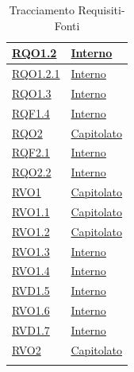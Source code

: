 \begin{longtable}{|>{\centering}m{5cm}|m{5cm}<{\centering}|}
\hyperlink{RQO1.2}{RQO1.2} & \hyperlink{Interno}{Interno}\\ \hline

\hyperlink{RQO1.2.1}{RQO1.2.1} & \hyperlink{Interno}{Interno}\\ \hline

\hyperlink{RQO1.3}{RQO1.3} & \hyperlink{Interno}{Interno}\\ \hline

\hyperlink{RQF1.4}{RQF1.4} & \hyperlink{Interno}{Interno}\\ \hline

\hyperlink{RQO2}{RQO2} & \hyperlink{Capitolato}{Capitolato}\\ \hline

\hyperlink{RQF2.1}{RQF2.1} & \hyperlink{Interno}{Interno}\\ \hline

\hyperlink{RQO2.2}{RQO2.2} & \hyperlink{Interno}{Interno}\\ \hline

\hyperlink{RVO1}{RVO1} & \hyperlink{Capitolato}{Capitolato}\\ \hline

\hyperlink{RVO1.1}{RVO1.1} & \hyperlink{Capitolato}{Capitolato}\\ \hline

\hyperlink{RVO1.2}{RVO1.2} & \hyperlink{Capitolato}{Capitolato}\\ \hline

\hyperlink{RVO1.3}{RVO1.3} & \hyperlink{Interno}{Interno}\\ \hline

\hyperlink{RVO1.4}{RVO1.4} & \hyperlink{Interno}{Interno}\\ \hline

\hyperlink{RVD1.5}{RVD1.5} & \hyperlink{Interno}{Interno}\\ \hline

\hyperlink{RVO1.6}{RVO1.6} & \hyperlink{Interno}{Interno}\\ \hline

\hyperlink{RVD1.7}{RVD1.7} & \hyperlink{Interno}{Interno}\\ \hline

\hyperlink{RVO2}{RVO2} & \hyperlink{Capitolato}{Capitolato}\\ \hline

\caption[Tracciamento Requisiti-Fonti]{Tracciamento Requisiti-Fonti}
\label{tabella:requi-fonti}
\end{longtable}
\clearpage

